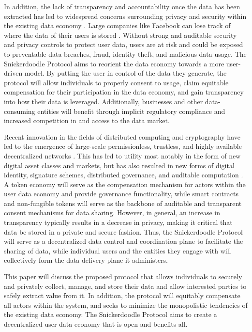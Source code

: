 In addition, the lack of transparency and accountability once the data has been extracted has led to widespread concerns surrounding privacy and security within the 
existing data economy \cite{auxier_americans_2019}\cite{ConsolitdationWeb}. Large companies like Facebook can lose track of where the data of their users is stored 
\cite{FacebookDoesntKnow}. Without strong and auditable security and privacy controls to protect user data, users are at risk and could be exposed to preventable data 
breaches, fraud, identity theft, and malicious data usage. The Snickerdoodle Protocol aims to reorient the data economy towards a more user-driven model. By putting 
the user in control of the data they generate, the protocol will allow individuals to properly consent to usage, claim equitable compensation for their participation 
in the data economy, and gain transparency into how their data is leveraged. Additionally, businesses and other data-consuming entities will benefit through implicit 
regulatory compliance and increased competition in and access to the data market.

Recent innovation in the fields of distributed computing and cryptography have led to the emergence of large-scale permissionless, trustless, and highly available 
decentralized networks \cite{SANTANA2022121806}. This has led to utility most notably in the form of new digital asset classes and markets, but has also resulted 
in new forms of digital identity, signature schemes, distributed governance, and auditable computation \cite{Politou2022}. A token economy will serve as the 
compensation mechanism for actors within the user data economy and provide governance functionality, while smart contracts and non-fungible tokens will serve as 
the backbone of auditable and transparent consent mechanisms for data sharing. However, in general, an increase in transparency typically results in a decrease 
in privacy, making it critical that data be stored in a private and secure fashion. Thus, the Snickerdoodle Protocol will serve as a decentralized data control and coordination 
plane to facilitate the sharing of data, while individual users and the entities they engage with will collectively form the data delivery plane it administers. 

This paper will discuss the proposed protocol that allows individuals to securely and privately collect, manage, and store their data and allow interested parties 
to safely extract value from it. In addition, the protocol will equitably compensate all actors within the system, and seeks to minimize the monopolistic tendencies 
of the existing data economy. The Snickerdoodle Protocol aims to create a decentralized user data economy that is open and benefits all.